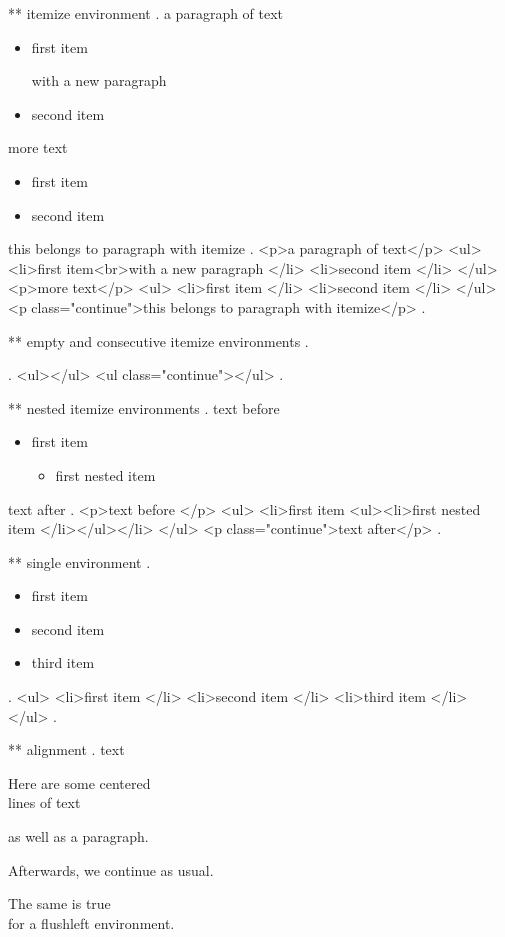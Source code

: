** itemize environment
.
a paragraph of text

\begin{itemize}
    \item first item

        with a new paragraph
    \item second item
\end{itemize}

more text

\begin{itemize}
    \item first item
    \item second item
\end{itemize}
this belongs to paragraph with itemize
.
<p>a paragraph of text</p>
<ul>
<li>ﬁrst item<br>with a new paragraph </li>
<li>second item </li>
</ul>
<p>more text</p>
<ul>
<li>ﬁrst item </li>
<li>second item </li>
</ul>
<p class="continue">this belongs to paragraph with itemize</p>
.


** empty and consecutive itemize environments
.
\begin{itemize}
\end{itemize}
\begin{itemize}
\end{itemize}
.
<ul></ul>
<ul class="continue"></ul>
.


** nested itemize environments
.
text before
\begin{itemize}
    \item first item
        \begin{itemize}
            \item first nested item
        \end{itemize}
\end{itemize}
text after
.
<p>text before </p>
<ul>
<li>ﬁrst item <ul><li>ﬁrst nested item </li></ul></li>
</ul>
<p class="continue">text after</p>
.


** single environment
.
\begin{itemize}
    \item first item
    \item second item
    \item third item
\end{itemize}
.
<ul>
<li>ﬁrst item </li>
<li>second item </li>
<li>third item </li>
</ul>
.


** alignment
.
text
\begin{center}
    Here are some centered\\
    lines of text

    as well as a paragraph.
\end{center}
Afterwards, we continue as usual.
\begin{flushleft}
    The same is true\\
    for a flushleft environment.
\end{flushleft}

